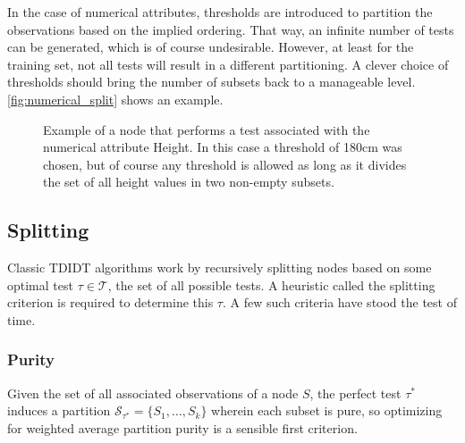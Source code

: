 In the case of numerical attributes, thresholds are introduced to partition the observations based on the implied ordering. That way, an infinite number of tests can be generated, which is of course undesirable. However, at least for the training set, not all tests will result in a different partitioning. A clever choice of thresholds should bring the number of subsets back to a manageable level. \autoref{fig:numerical_split} shows an example.

\begin{figure}[htp]%
\label{fig:numerical_split}
\begin{center}
\end{center}
\caption{Example of a node that performs a test associated with the numerical attribute Height. In this case a threshold of 180cm was chosen, but of course any threshold is allowed as long as it divides the set of all height values in two non-empty subsets.}
\end{figure}


\subsection{Splitting}
Classic TDIDT algorithms work by recursively splitting nodes based on some optimal test $\tau \in \mathcal{T}$, the set of all possible tests. A heuristic called the splitting criterion is required to determine this $\tau$. A few such criteria have stood the test of time.

\subsubsection{Purity}
Given the set of all associated observations of a node $S$, the perfect test $\tau^*$ induces a partition $\mathcal{S}_{\tau^*} = \{S_1, \ldots, S_k\}$ wherein each subset is pure, so optimizing for weighted average partition purity is a sensible first criterion.

